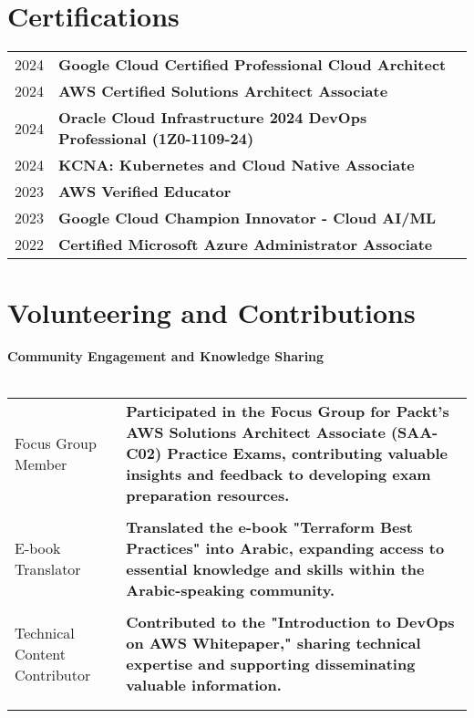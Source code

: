 \documentclass[a4paper,11pt]{article}
\begin{document}
\section{Certifications}
\begin{tabularx}{\linewidth}{@{}l X@{}}	
2024 & \textbf{Google Cloud Certified Professional Cloud Architect} \\
2024 & \textbf{AWS Certified Solutions Architect Associate}  \\
2024 & \textbf{Oracle Cloud Infrastructure 2024 DevOps Professional (1Z0-1109-24)} \\
2024 & \textbf{KCNA: Kubernetes and Cloud Native Associate}  \\ 
2023 & \textbf{AWS Verified Educator}  \\ 
2023 & \textbf{Google Cloud Champion Innovator - Cloud AI/ML}  \\ 
2022 & \textbf{Certified Microsoft Azure Administrator Associate}  \\ 
\end{tabularx}


\section{Volunteering and Contributions}


\textbf{Community Engagement and Knowledge Sharing} \\
\\
\begin{tabularx}{\linewidth}{@{}l X@{}}	
Focus Group Member & \textbf{Participated in the Focus Group for Packt's AWS Solutions Architect Associate (SAA-C02) Practice Exams, contributing valuable insights and feedback to developing exam preparation resources.}  \\
\\
E-book Translator & \textbf{Translated the e-book "Terraform Best Practices" into Arabic, expanding access to essential knowledge and skills within the Arabic-speaking community.}  \\ 
\\
Technical Content Contributor & \textbf{Contributed to the "Introduction to DevOps on AWS Whitepaper," sharing technical expertise and supporting disseminating valuable information.}  \\ 
\\
\\
\end{tabularx}
\end{document}
